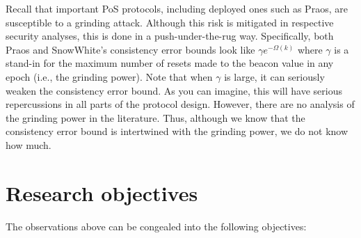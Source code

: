 Recall that important PoS protocols, including deployed ones such as Praos, 
are susceptible to a grinding attack. 
Although this risk is mitigated in respective security analyses, 
this is done in a push-under-the-rug way. 
Specifically, both Praos and SnowWhite's consistency error bounds look like 
$\gamma e^{-\Omega(k)}$ where 
$\gamma$ is a stand-in for the maximum number of resets 
made to the beacon value in any epoch
(i.e., the grinding power). 
Note that when $\gamma$ is large, 
it can seriously weaken the consistency error bound. 
As you can imagine, this will have serious repercussions in all parts of the protocol design. 
However, there are no analysis of the grinding power in the literature. 
Thus, although we know that the consistency error bound is intertwined with 
the grinding power, we do not know how much.











\section{Research objectives}\label{sec:intro-objectives}
The observations above can be congealed into the following objectives:

